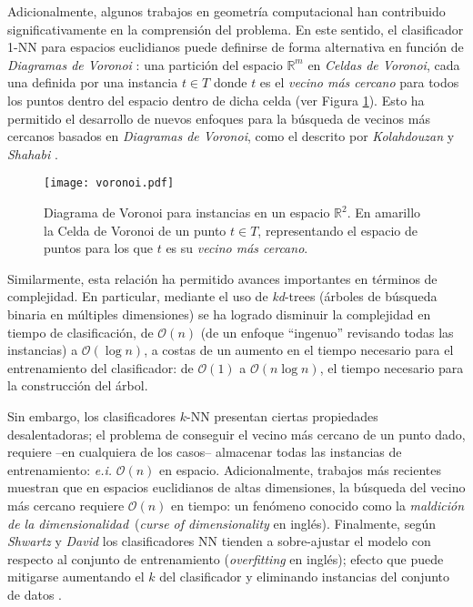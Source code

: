 Adicionalmente, algunos trabajos en geometría computacional han contribuido significativamente en la comprensión del problema. En este sentido, el clasificador 1-NN para espacios euclidianos puede definirse de forma alternativa en función de \emph{Diagramas de Voronoi} \cite{voronoi1908nouvelles}: una partición del espacio $\mathbb{R}^m$ en \emph{Celdas de Voronoi}, cada una definida por una instancia $t \in T$ donde $t$ es el \emph{vecino más cercano} para todos los puntos dentro del espacio dentro de dicha celda (ver Figura \ref{voronoi}). Esto ha permitido el desarrollo de nuevos enfoques para la búsqueda de vecinos más cercanos basados en \emph{Diagramas de Voronoi}, como el descrito por \emph{Kolahdouzan} y \emph{Shahabi} \cite{Kolahdouzan:2004:VKN:1316689.1316762}.

\begin{figure}[h!]
\centering
\texttt{[image: voronoi.pdf]}
\caption[Diagramas de Voronoi y NN]{Diagrama de Voronoi para instancias en un espacio $\mathbb{R}^2$. En amarillo la Celda de Voronoi de un punto $t \in T$, representando el espacio de puntos para los que $t$ es su \emph{vecino más cercano}.}
\label{voronoi}
\end{figure}

Similarmente, esta relación ha permitido avances importantes en términos de complejidad. En particular, mediante el uso de \emph{kd}-trees \cite{Bentley:1975:MBS:361002.361007} (árboles de búsqueda binaria en múltiples dimensiones) se ha logrado disminuir la complejidad en tiempo de clasificación, de $\mathcal{O}(n)$ (de un enfoque ``ingenuo'' revisando todas las instancias) a $\mathcal{O}(\log{n})$, a costas de un aumento en el tiempo necesario para el entrenamiento del clasificador: de $\mathcal{O}(1)$ a $\mathcal{O}(n\log{n})$, el tiempo necesario para la construcción del árbol.

Sin embargo, los clasificadores $k$-NN presentan ciertas propiedades desalentadoras; el problema de conseguir el vecino más cercano de un punto dado, requiere --en cualquiera de los casos-- almacenar todas las instancias de entrenamiento: \emph{e.i.} $\mathcal{O}(n)$ en espacio. Adicionalmente, trabajos más recientes \cite{DBLP:conf/soda/KrauthgamerL04} muestran que en espacios euclidianos de altas dimensiones, la búsqueda del vecino más cercano requiere $\mathcal{O}(n)$ en tiempo: un fenómeno conocido como la \guillemotleft\emph{maldición de la dimensionalidad}\guillemotright\ (\emph{curse of dimensionality} en inglés). Finalmente, según \emph{Shwartz} y \emph{David} \cite{shalev2014understanding} los clasificadores NN tienden a sobre-ajustar el modelo con respecto al conjunto de entrenamiento (\emph{overfitting} en inglés); efecto que puede mitigarse aumentando el $k$ del clasificador \cite{devroye1994strong, shalev2014understanding} y eliminando instancias del conjunto de datos \cite{DBLP:journals/corr/GottliebKK13}.

